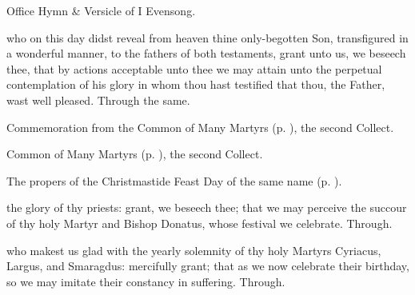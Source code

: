 \begin{rubric}
	Office Hymn \& Versicle of I Evensong.
\end{rubric}



\collect
{} who on this day didst reveal from heaven thine only-begotten Son, transfigured in a wonderful manner, to the fathers of both testaments, grant unto us, we beseech thee, that by actions acceptable unto thee we may attain unto the perpetual contemplation of his glory in whom thou hast testified that thou, the Father, wast well pleased. Through the same.

\begin{rubric}
	 Commemoration  from the Common of Many Martyrs (p. \pageref{CommonMartyrsNotBishopsCollect}), the second Collect.
\end{rubric}


\clearpage
{}

\begin{rubric}
	Common of Many Martyrs (p. \pageref{CommonMartyrsNotBishopsCollect}), the second Collect.
\end{rubric}



\begin{rubric}
    The propers of the Christmastide Feast Day of the same name (p. \pageref{MostHolyName}).
\end{rubric}



\memorialCollect
{} the glory of thy priests: grant, we beseech thee; that we may perceive the succour of thy holy Martyr and Bishop Donatus, whose festival we celebrate. Through.



\memorialCollect
{} who makest us glad with the yearly solemnity of thy holy Martyrs Cyriacus, Largus, and Smaragdus: mercifully grant; that as we now celebrate their birthday, so we may imitate their constancy in suffering. Through.

